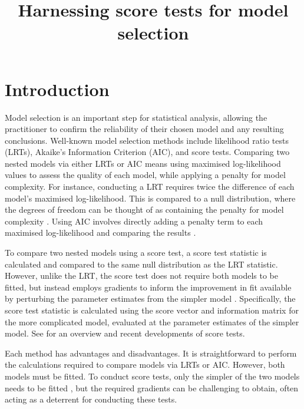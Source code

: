 \documentclass{article}
\title{Harnessing score tests for model selection}
\begin{document}
\maketitle

\doublespacing
\linenumbers

\section{Introduction}
\label{sec:introduction}

Model selection is an important step for
statistical analysis, allowing the practitioner to confirm the
reliability of their chosen model and any resulting
conclusions. Well-known model selection methods include likelihood
ratio tests (LRTs), Akaike's Information Criterion (AIC), and score 
tests. Comparing two nested models via either LRTs or AIC means 
 using maximised log-likelihood values to assess the quality of
each model, while applying a penalty for model
complexity. For instance, conducting a LRT requires twice the difference of each
model's maximised log-likelihood. This is 
compared to a null distribution, where
the degrees of freedom can be thought of as containing the penalty for
model complexity \parencite{vaartAsymptoticStatistics2012}. 
Using AIC involves directly adding a penalty term to each
maximised log-likelihood and comparing the results \parencite{burnham2002}. 

To compare two nested models using a score test, a score test
statistic is calculated and compared to the same null
distribution as the LRT statistic. However, unlike the LRT, the score
test does not require both models to be fitted, but instead
employs gradients to inform the improvement in fit available by
perturbing the parameter estimates from the simpler model
\parencite{rao2005}. Specifically, the score test statistic is
calculated using the
score vector and information matrix for the more complicated model,
evaluated at the parameter estimates of the simpler model. See
\textcite{rao2005} for an overview and recent developments of score
tests. 

Each method has advantages and
disadvantages. It is straightforward to perform the
calculations required to compare models via LRTs or AIC. However, both
models must be fitted. To conduct score tests, only the simpler of the
two models needs to be fitted \parencite{rao2005}, but the required
gradients can be challenging to obtain, often acting as a
deterrent for conducting these tests. 
\end{document}
